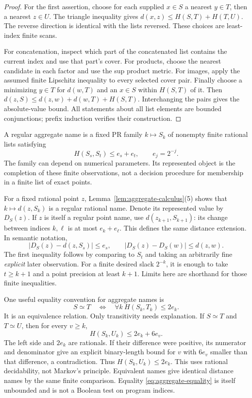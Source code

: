\begin{proof}
For the first assertion, choose for each supplied $x\in S$ a nearest
$y\in T$, then a nearest $z\in U$. The triangle inequality gives
$d(x,z)\le H(S,T)+H(T,U)$. The reverse direction is identical with the
lists reversed. These choices are least-index finite scans.

For concatenation, inspect which part of the concatenated list contains
the current index and use that part's cover. For products, choose the
nearest candidate in each factor and use the sup product metric. For
images, apply the assumed finite Lipschitz inequality to every selected
cover pair. Finally choose a minimizing $y\in T$ for $d(w,T)$ and an
$x\in S$ within $H(S,T)$ of it. Then
$d(z,S)\le d(z,w)+d(w,T)+H(S,T)$. Interchanging the pairs gives the
absolute-value bound. All statements about all list elements are bounded
conjunctions; prefix induction verifies their construction.
\end{proof}

\begin{definition}\label{def:aggregate-name}
A regular aggregate name is a fixed PR family $k\mapsto S_k$ of
nonempty finite rational lists satisfying
\[
                      H(S_s,S_t)\le e_s+e_t,
             \qquad e_j=2^{-j}.                 \tag{A}\label{eq:aggregate-name}
\]
The family can depend on numerical parameters. Its represented object
is the completion of these finite observations, not a decision procedure
for membership in a finite list of exact points.
\end{definition}

For a fixed rational point $z$, Lemma~\ref{lem:aggregate-calculus}(5)
shows that $k\mapsto d(z,S_k)$ is a regular rational name. Denote its
represented value by $D_S(z)$. If $z$ is itself a regular point name,
use $d(z_{k+1},S_{k+1})$: its change between indices $k,\ell$ is at
most $e_k+e_\ell$. This defines the same distance extension. In semantic
notation,
\[
 |D_S(z)-d(z,S_s)|\le e_s,\qquad
 |D_S(z)-D_S(w)|\le d(z,w).                       \tag{D}\label{eq:distance-name}
\]
The first inequality follows by comparing to $S_t$ and taking an
arbitrarily fine \emph{explicit} later observation. For a finite desired
slack $2^{-k}$, it is enough to take $t\ge k+1$ and a point precision
at least $k+1$. Limits here are shorthand for those finite inequalities.

One useful equality convention for aggregate names is
\[
                     S\simeq T\quad\Longleftrightarrow\quad
              \forall k\ H(S_k,T_k)\le2e_k.     \tag{E}\label{eq:aggregate-equality}
\]
It is an equivalence relation. Only transitivity needs explanation.
If $S\simeq T$ and $T\simeq U$, then for every $v\ge k$,
\[
 H(S_k,U_k)\le2e_k+6e_v.
\]
The left side and $2e_k$ are rationals. If their difference were positive,
its numerator and denominator give an explicit binary-length bound for
$v$ with $6e_v$ smaller than that difference, a contradiction. Thus
$H(S_k,U_k)\le2e_k$. This uses rational decidability, not Markov's
principle. Equivalent names give identical distance names by the same
finite comparison. Equality \eqref{eq:aggregate-equality} is itself
unbounded and is not a Boolean test on program indices.

